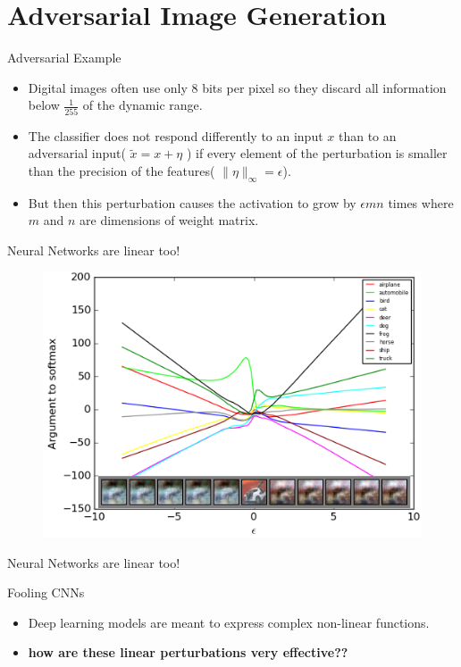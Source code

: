 \documentclass[10pt]{beamer}
\begin{document}
\section{Adversarial Image Generation}
\begin{frame}{Adversarial Example}

\begin{itemize}
	\item Digital images often use only 8 bits per pixel so they discard all information below $\frac{1}{255}$ of the dynamic range.
	\item The classifier does not respond differently to an input $x$ than to an adversarial input( $\tilde{x} = x + \eta$ ) if every element of the perturbation is smaller than the precision of the features( $\|\eta \|_{\infty} = \epsilon$). 
	\item But then this perturbation causes the activation to grow by $\epsilon m n$ times where $m$ and $n$ are dimensions of weight matrix.
		
\end{itemize}
\end{frame}

\begin{frame}{Neural Networks are linear too!}
	\begin{figure}
		\includegraphics[width=\textwidth]{linear-adv}
	\end{figure}
\end{frame}
\begin{frame}{Neural Networks are linear too!}
	\begin{alertblock}{Fooling CNNs}
	\begin{itemize}[<+- | alert@+>]
		\item Deep learning models are meant to express complex non-linear functions.
		\item \alert{\textbf{how are these linear perturbations very effective??}}
	\end{itemize}
	\end{alertblock}
\end{frame}
\end{document}

